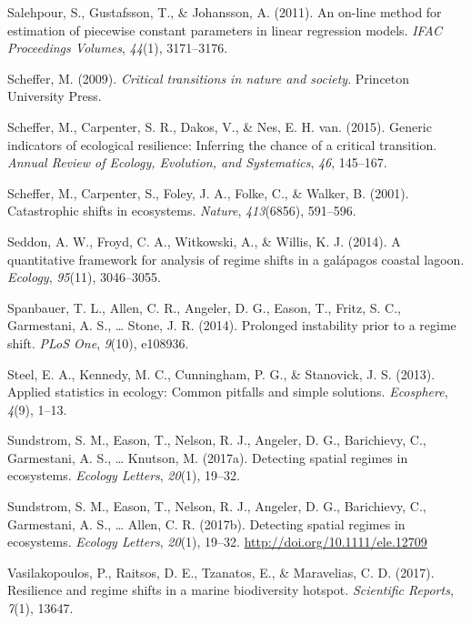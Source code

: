 \documentclass[12pt,twoside,openany]{reedthesis}
\begin{document}
\hypertarget{ref-salehpour2011line}{}
Salehpour, S., Gustafsson, T., \& Johansson, A. (2011). An on-line
method for estimation of piecewise constant parameters in linear
regression models. \emph{IFAC Proceedings Volumes}, \emph{44}(1),
3171--3176.

\hypertarget{ref-scheffer_critical_2009}{}
Scheffer, M. (2009). \emph{Critical transitions in nature and society}.
Princeton University Press.

\hypertarget{ref-scheffer2015generic}{}
Scheffer, M., Carpenter, S. R., Dakos, V., \& Nes, E. H. van. (2015).
Generic indicators of ecological resilience: Inferring the chance of a
critical transition. \emph{Annual Review of Ecology, Evolution, and
Systematics}, \emph{46}, 145--167.

\hypertarget{ref-scheffer_catastrophic_2001}{}
Scheffer, M., Carpenter, S., Foley, J. A., Folke, C., \& Walker, B.
(2001). Catastrophic shifts in ecosystems. \emph{Nature},
\emph{413}(6856), 591--596.

\hypertarget{ref-seddon2014quantitative}{}
Seddon, A. W., Froyd, C. A., Witkowski, A., \& Willis, K. J. (2014). A
quantitative framework for analysis of regime shifts in a galápagos
coastal lagoon. \emph{Ecology}, \emph{95}(11), 3046--3055.

\hypertarget{ref-spanbauer_prolonged_2014}{}
Spanbauer, T. L., Allen, C. R., Angeler, D. G., Eason, T., Fritz, S. C.,
Garmestani, A. S., \ldots{} Stone, J. R. (2014). Prolonged instability
prior to a regime shift. \emph{PLoS One}, \emph{9}(10), e108936.

\hypertarget{ref-steel2013applied}{}
Steel, E. A., Kennedy, M. C., Cunningham, P. G., \& Stanovick, J. S.
(2013). Applied statistics in ecology: Common pitfalls and simple
solutions. \emph{Ecosphere}, \emph{4}(9), 1--13.

\hypertarget{ref-sundstrom_detecting_2017}{}
Sundstrom, S. M., Eason, T., Nelson, R. J., Angeler, D. G., Barichievy,
C., Garmestani, A. S., \ldots{} Knutson, M. (2017a). Detecting spatial
regimes in ecosystems. \emph{Ecology Letters}, \emph{20}(1), 19--32.

\hypertarget{ref-sundstrom2017detecting}{}
Sundstrom, S. M., Eason, T., Nelson, R. J., Angeler, D. G., Barichievy,
C., Garmestani, A. S., \ldots{} Allen, C. R. (2017b). Detecting spatial
regimes in ecosystems. \emph{Ecology Letters}, \emph{20}(1), 19--32.
\url{http://doi.org/10.1111/ele.12709}

\hypertarget{ref-vasilakopoulos2017resilience}{}
Vasilakopoulos, P., Raitsos, D. E., Tzanatos, E., \& Maravelias, C. D.
(2017). Resilience and regime shifts in a marine biodiversity hotspot.
\emph{Scientific Reports}, \emph{7}(1), 13647.
\end{document}
